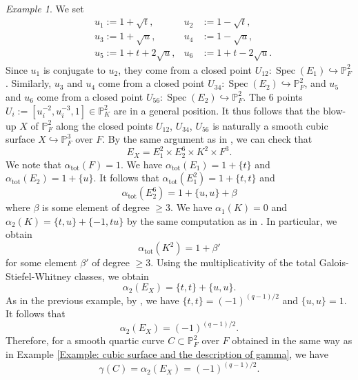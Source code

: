 \documentclass{amsart}
\theoremstyle{definition}
\theoremstyle{remark}
\newtheorem{examp}[prop]{Example}
\DeclareMathOperator{\Spec}{Spec}
\newcommand{\PP}{\mathbb P}
\begin{document}
\begin{examp}\label{Example: nontrivial gamma, q-1/2 is odd}
    We set
    \begin{align*}
        &u_1:= 1 + \sqrt{t}, &u_2 &:= 1 - \sqrt{t}, \\
        &u_3:= 1 + \sqrt{u}, &u_4 &:= 1 - \sqrt{u}, \\
        &u_5:= 1 + t + 2\sqrt{u}, &u_6 &:= 1 + t - 2\sqrt{u}.
    \end{align*}
    Since $u_1$ is conjugate to $u_2$, they come from a closed point
    $U_{12} \colon \Spec (E_1) \hookrightarrow \PP^2_{F}$.
    Similarly, $u_3$ and $u_4$ come from a closed point
    $U_{34} \colon \Spec (E_2) \hookrightarrow \PP^2_{F}$, and
    $u_5$ and $u_6$ come from a closed point
    $U_{56} \colon \Spec (E_2) \hookrightarrow \PP^2_{F}$.
    The $6$ points $U_i:=[u^{-2}_i, u^{-3}_i, 1] \in \PP^2_{K}$ are in a general position.
    It thus follows that the blow-up $X$ of $\PP^2_{F}$ along the closed points $U_{12}$, $U_{34}$, $U_{56}$ is naturally a smooth cubic surface $X \hookrightarrow \PP^3_{F}$ over $F$.
    By the same argument as in \cite[Section 3.4]{Lorenzo-Pirisi}, we can check that
    \[
    E_X = E^2_1 \times E^6_2 \times K^2 \times F^3.
    \]
    We note that $\alpha_{\mathrm{tot}}(F)= 1$.
    We have $\alpha_{\mathrm{tot}}(E_1)= 1 + \{ t  \}$ and $\alpha_{\mathrm{tot}}(E_2)= 1 + \{ u  \}$.
    It follows that
    $
    \alpha_{\mathrm{tot}}(E^2_1) = 1 + \{ t, t \}
    $
    and
    \[
    \alpha_{\mathrm{tot}}(E^6_2) = 1 + \{ u, u \} + \beta
    \]
    where $\beta$ is some element of degree $\geq 3$.
    We have $\alpha_1(K) = 0$ and $\alpha_2(K) = \{ t, u \} + \{ -1, tu \}$ by the same computation as in \cite[Example 3.11]{Lorenzo-Pirisi}.
    In particular, we obtain
    \[
    \alpha_{\mathrm{tot}}(K^2) = 1 + \beta'
    \]
    for some element $\beta'$ of degree $\geq 3$.
    Using the multiplicativity of the total Galois-Stiefel-Whitney classes, we obtain
    \[
    \alpha_2(E_X) = \{ t, t \} + \{ u, u \}.
    \]
    As in the previous example,
    by \cite[Chapter XIV, Section 3, Corollary]{SerreLocalfields}, we have $\{ t, t \} = (-1)^{(q-1)/2}$ and $\{ u, u \} = 1$.
    It follows that
    \[
    \alpha_2(E_X)= (-1)^{(q-1)/2}.
    \]
    Therefore, for a smooth quartic curve $C \subset \PP^2_{F}$ over $F$ obtained in the same way as in Example \ref{Example: cubic surface and the description of gamma}, we have
    \[
    \gamma(C)=\alpha_2(E_X)= (-1)^{(q-1)/2}.
    \]
\end{examp}
\end{document}
